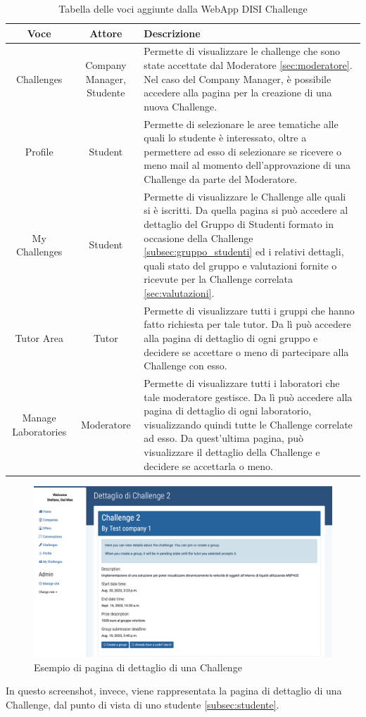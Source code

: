 \begin{table}[ht]
    \centering
    \begin{tabularx}{\textwidth}{|c|c|X|}
        \hline
        \textbf{Voce} & \textbf{Attore} & \textbf{Descrizione}\\
        \hline
        Challenges & Company Manager, Studente & Permette di visualizzare le challenge che sono state accettate dal Moderatore \ref{sec:moderatore}. Nel caso del Company Manager, è possibile accedere alla pagina per la creazione di una nuova Challenge. \\
        \hline
        Profile & Student & Permette di selezionare le aree tematiche alle quali lo studente è interessato, oltre a permettere ad esso di selezionare se ricevere o meno mail al momento dell'approvazione di una Challenge da parte del Moderatore.\\
        \hline 
        My Challenges & Student & Permette di visualizzare le Challenge alle quali si è iscritti. Da quella pagina si può accedere al dettaglio del Gruppo di Studenti formato in occasione della Challenge \ref{subsec:gruppo_studenti} ed i relativi dettagli, quali stato del gruppo e valutazioni fornite o ricevute per la Challenge correlata \ref{sec:valutazioni}.\\
        \hline 
        Tutor Area & Tutor & Permette di visualizzare tutti i gruppi che hanno fatto richiesta per tale tutor. Da lì può accedere alla pagina di dettaglio di ogni gruppo e decidere se accettare o meno di partecipare alla Challenge con esso.\\
        \hline
        Manage Laboratories & Moderatore & Permette di visualizzare tutti i laboratori che tale moderatore gestisce. Da lì può accedere alla pagina di dettaglio di ogni laboratorio, visualizzando quindi tutte le Challenge correlate ad esso. Da quest'ultima pagina, può visualizzare il dettaglio della Challenge e decidere se accettarla o meno.\\
        \hline
    \end{tabularx}
    \caption{Tabella delle voci aggiunte dalla WebApp DISI Challenge}
\end{table}

\begin{figure}[H]
    \centering
    \includegraphics[scale=0.3]{images/challenge_sample.png}
    \caption{Esempio di pagina di dettaglio di una Challenge}
    \label{fig:challenge_sample}
\end{figure}

In questo screenshot, invece, viene rappresentata la pagina di dettaglio di una Challenge, dal punto di vista di uno studente \ref{subsec:studente}.

\clearpage
